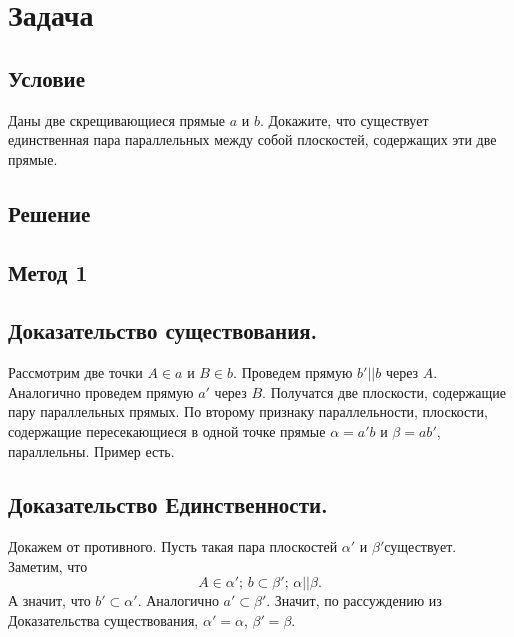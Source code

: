 



\section*{Задача}

\subsection*{Условие}
Даны две скрещивающиеся прямые $a$ и $b$. Докажите, что существует единственная пара параллельных между собой плоскостей, содержащих эти две прямые.
\subsection*{Решение}
\subsection*{Метод 1}
\subsection*{Доказательство существования.}
Рассмотрим две точки $A\in a$ и $B\in b$. Проведем прямую $b'||b$ через $A$. Аналогично проведем прямую $a'$ через $B$. Получатся две плоскости, содержащие пару параллельных прямых. По второму признаку параллельности, плоскости, содержащие пересекающиеся в одной точке прямые $\alpha=a'b$ и $\beta=ab'$, параллельны. Пример есть.
\subsection*{Доказательство Единственности.}
Докажем от противного. Пусть такая пара плоскостей $\alpha'$ и $\beta'$существует. Заметим, что
\begin{equation}
	A\in\alpha';\, b\subset\beta';\, \alpha||\beta.
\end{equation}
А значит, что $b'\subset \alpha'$. Аналогично $a'\subset\beta'$. Значит, по рассуждению из Доказательства существования, $\alpha'=\alpha$, $\beta'=\beta$.

\newpage

